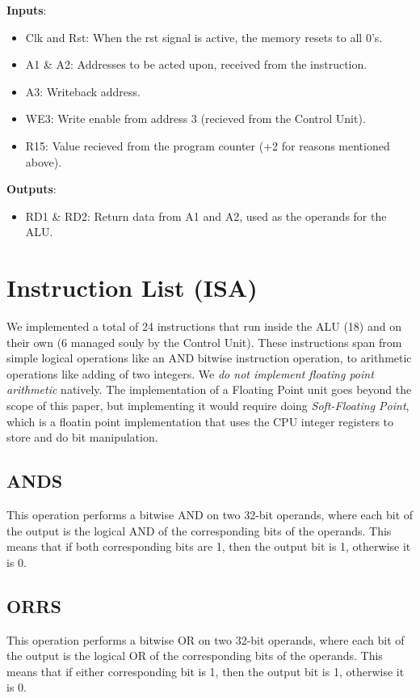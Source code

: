 \documentclass[9pt,a4paper,twoside]{tau}
\begin{document}
    \textbf{Inputs}:
    \begin{itemize}
        \item Clk and Rst: When the rst signal is active, the memory resets to all 0's.
        \item A1 \& A2: Addresses to be acted upon, received from the instruction.
        \item A3: Writeback address.
        \item WE3: Write enable from address 3 (recieved from the Control Unit).
        \item R15: Value recieved from the program counter (+2 for reasons mentioned above).
    \end{itemize}
    
    \textbf{Outputs}:
    \begin{itemize}
    \item RD1 \& RD2: Return data from A1 and A2, used as the operands for the ALU.
    \end{itemize}
    






        \section{Instruction List (ISA)}


        We implemented a total of 24 instructions that run inside the ALU (18) and on their own (6 managed souly by the Control Unit). These instructions span from simple logical operations like an AND bitwise instruction operation, to arithmetic operations like adding of two integers. We \textit{do not implement floating point arithmetic} natively. The implementation of a Floating Point unit goes beyond the scope of this paper, but implementing it would require doing \textit{Soft-Floating Point}, which is a floatin point implementation that uses the CPU integer registers to store and do bit manipulation.  
    
        \subsection{ANDS}
        This operation performs a bitwise AND on two 32-bit operands, where each bit of the output is the logical AND of the corresponding bits of the operands. This means that if both corresponding bits are 1, then the output bit is 1, otherwise it is 0. 
        \subsection{ORRS}
        This operation performs a bitwise OR on two 32-bit operands, where each bit of the output is the logical OR of the corresponding bits of the operands. This means that if either corresponding bit is 1, then the output bit is 1, otherwise it is 0. 
\end{document}
